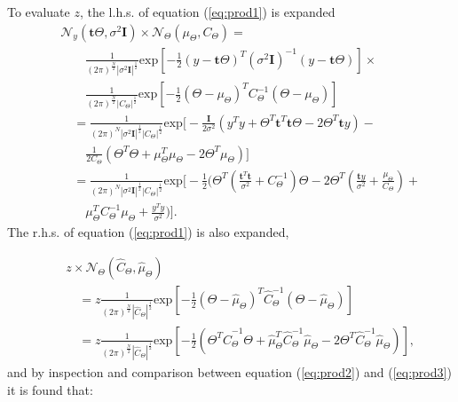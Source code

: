 To evaluate $z$, the l.h.s. of equation (\ref{eq:prod1}) is expanded
{\setlength\arraycolsep{2pt}
\begin{eqnarray}
\label{eq:prod2} & & \mathcal{N}_y(\textbf{t}\Theta,\sigma^2 \textbf{I})\times\mathcal{N}_\Theta(\mu_\Theta,C_\Theta) = \\\nonumber
& & \qquad \frac{1}{(2\pi)^{\frac{N}{2}} |\sigma^2\textbf{I}|^{\frac{1}{2}}} \textrm{exp}\left[-\frac{1}{2}(y - \textbf{t}\Theta)^T(\sigma^2 \textbf{I})^{-1}(y - \textbf{t}\Theta)\right] \times {} \\\nonumber
& & \qquad \frac{1}{(2\pi)^{\frac{N}{2}}|C_\Theta|^{\frac{1}{2}}} \textrm{exp}\left[-\frac{1}{2}(\Theta - \mu_\Theta)^TC_\Theta^{-1}(\Theta - \mu_\Theta)\right] \\\nonumber
& & \quad= \frac{1}{(2\pi)^N |\sigma^2\textbf{I}|^{\frac{1}{2}} |C_\Theta|^{\frac{1}{2}}} \textrm{exp}\bigg[-\frac{\textbf{I}}{2\sigma^2}\left(y^Ty+\Theta^T\textbf{t}^T\textbf{t}\Theta - 2 \Theta^T\textbf{t}y\right) - {} \\\nonumber
& & \qquad \frac{1}{2C_\Theta} \left(\Theta^T\Theta + \mu_\Theta^T\mu_\Theta - 2 \Theta^T\mu_\Theta\right) \bigg] \\\nonumber
& & \quad = \frac{1}{(2\pi)^N |\sigma^2\textbf{I}|^{\frac{1}{2}} |C_\Theta|^{\frac{1}{2}}} \textrm{exp}\Bigg[-\frac{1}{2}\Bigg(\Theta^T\left(\frac{\textbf{t}^T\textbf{t}}{\sigma^2} + C_\Theta^{-1}\right)\Theta - 2 \Theta^T\left(\frac{\textbf{t}y}{\sigma^2} + \frac{\mu_\Theta}{C_\Theta}\right) + {}\\\nonumber
& & \qquad \mu_\Theta^TC_\Theta^{-1}\mu_\Theta + \frac{y^Ty}{\sigma^2}\Bigg)\Bigg].
\end{eqnarray}}
The r.h.s. of equation (\ref{eq:prod1}) is also expanded,

{\setlength\arraycolsep{2pt}
\begin{eqnarray}
\label{eq:prod3} & & z \times \mathcal{N}_\Theta(\hat{C}_\Theta,\hat{\mu}_\Theta) \\\nonumber
& & \quad = z\frac{1}{(2\pi)^{\frac{N}{2}} |\hat{C}_\Theta|^{\frac{1}{2}}} \textrm{exp}\left[-\frac{1}{2}\left(\Theta - \hat{\mu}_\Theta\right)^T\hat{C}_\Theta^{-1}\left(\Theta - \hat{\mu}_\Theta\right)\right] \\\nonumber
& & \quad = z\frac{1}{(2\pi)^{\frac{N}{2}} |\hat{C}_\Theta|^{\frac{1}{2}}} \textrm{exp}\left[-\frac{1}{2}\left(\Theta^T\hat{C}_\Theta^{-1}\Theta + \hat{\mu}_\Theta^T\hat{C}_\Theta^{-1}\hat{\mu}_\Theta - 2\Theta^T\hat{C}_\Theta^{-1}\hat{\mu}_\Theta\right)\right],
\end{eqnarray}}
and by inspection and comparison between equation (\ref{eq:prod2}) and (\ref{eq:prod3}) it is found that:

